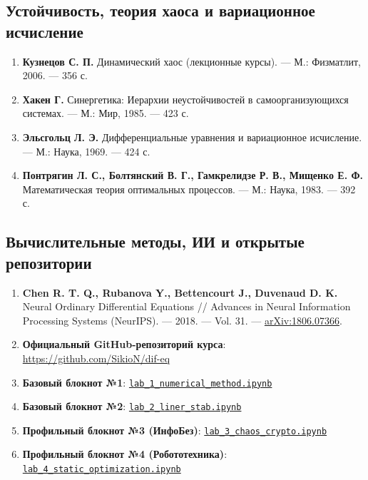 \documentclass[12pt]{article}
\begin{document}
\subsection*{Устойчивость, теория хаоса и вариационное исчисление}
\begin{enumerate}[nosep, leftmargin=1.8em]
    \item \textbf{Кузнецов С. П.} Динамический хаос (лекционные курсы). — М.: Физматлит, 2006. — 356 с.
    \item \textbf{Хакен Г.} Синергетика: Иерархии неустойчивостей в самоорганизующихся системах. — М.: Мир, 1985. — 423 с.
    \item \textbf{Эльсгольц Л. Э.} Дифференциальные уравнения и вариационное исчисление. — М.: Наука, 1969. — 424 с.
    \item \textbf{Понтрягин Л. С., Болтянский В. Г., Гамкрелидзе Р. В., Мищенко Е. Ф.} Математическая теория оптимальных процессов. — М.: Наука, 1983. — 392 с.
\end{enumerate}

\subsection*{Вычислительные методы, ИИ и открытые репозитории}
\begin{enumerate}[nosep, leftmargin=1.8em]
    \item \textbf{Chen R. T. Q., Rubanova Y., Bettencourt J., Duvenaud D. K.} Neural Ordinary Differential Equations // Advances in Neural Information Processing Systems (NeurIPS). — 2018. — Vol. 31. — \href{https://arxiv.org/abs/1806.07366}{arXiv:1806.07366}.
    \item \textbf{Официальный GitHub-репозиторий курса}: \href{https://github.com/SikioN/dif-eq}{https://github.com/SikioN/dif-eq}
    \item \textbf{Базовый блокнот №1}: \href{https://github.com/SikioN/dif-eq/blob/main/lab/lab_1_numerical_method.ipynb}{\texttt{lab\_1\_numerical\_method.ipynb}}
    \item \textbf{Базовый блокнот №2}: \href{https://github.com/SikioN/dif-eq/blob/main/lab/lab_2_liner_stab.ipynb}{\texttt{lab\_2\_liner\_stab.ipynb}}
    \item \textbf{Профильный блокнот №3 (ИнфоБез)}: \href{https://github.com/SikioN/dif-eq/blob/main/lab/lab_3_chaos_crypto.ipynb}{\texttt{lab\_3\_chaos\_crypto.ipynb}}
    \item \textbf{Профильный блокнот №4 (Робототехника)}: \href{https://github.com/SikioN/dif-eq/blob/main/lab/lab_4_static_optimization.ipynb}{\texttt{lab\_4\_static\_optimization.ipynb}}
\end{enumerate}
\end{document}
